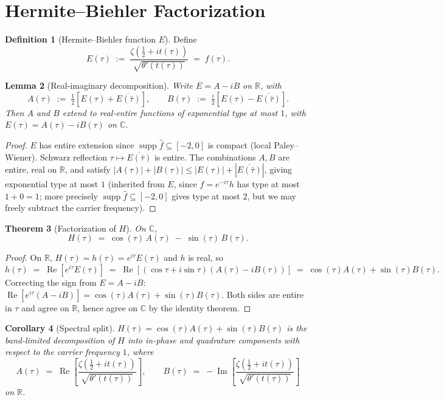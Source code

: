 \documentclass[11pt]{article}
\newtheorem{theorem}{Theorem}
\newtheorem{lemma}[theorem]{Lemma}
\newtheorem{corollary}[theorem]{Corollary}
\theoremstyle{definition}
\newtheorem{definition}[theorem]{Definition}
\DeclareMathOperator{\Real}{Re}
\DeclareMathOperator{\Imag}{Im}
\DeclareMathOperator{\supp}{supp}
\begin{document}
\section{Hermite--Biehler Factorization}

\begin{definition}[Hermite--Biehler function $E$]
Define
\[
E(\tau) \;:=\; \frac{\zeta(\tfrac12 + it(\tau))}{\sqrt{\theta'(t(\tau))}} \;=\; f(\tau) .
\]
\end{definition}

\begin{lemma}[Real-imaginary decomposition]\label{lem:AB}
Write $E = A - iB$ on $\mathbb{R}$, with
\[
A(\tau) \;:=\; \tfrac12[E(\tau) + \overline{E(\bar\tau)}], \qquad B(\tau) \;:=\; \tfrac{i}{2}[E(\tau) - \overline{E(\bar\tau)}].
\]
Then $A$ and $B$ extend to real-entire functions of exponential type at most $1$, with $E(\tau) = A(\tau) - iB(\tau)$ on $\mathbb{C}$.
\end{lemma}

\begin{proof}
$E$ has entire extension since $\supp\hat f \subseteq [-2, 0]$ is compact (local Paley--Wiener). Schwarz reflection $\tau \mapsto \overline{E(\bar\tau)}$ is entire. The combinations $A, B$ are entire, real on $\mathbb{R}$, and satisfy $|A(\tau)| + |B(\tau)| \le |E(\tau)| + |\overline{E(\bar\tau)}|$, giving exponential type at most $1$ (inherited from $E$, since $f = e^{-i\tau}h$ has type at most $1 + 0 = 1$; more precisely $\supp\hat f \subseteq [-2, 0]$ gives type at most $2$, but we may freely subtract the carrier frequency).
\end{proof}

\begin{theorem}[Factorization of $H$]\label{thm:fact}
On $\mathbb{C}$,
\[
H(\tau) \;=\; \cos(\tau)\,A(\tau) \;-\; \sin(\tau)\,B(\tau) .
\]
\end{theorem}

\begin{proof}
On $\mathbb{R}$, $H(\tau) = h(\tau) = e^{i\tau}E(\tau)$ and $h$ is real, so
\[
h(\tau) \;=\; \Real[e^{i\tau}E(\tau)] \;=\; \Real[(\cos\tau + i\sin\tau)(A(\tau) - iB(\tau))] \;=\; \cos(\tau)A(\tau) + \sin(\tau)B(\tau) .
\]
Correcting the sign from $E = A - iB$: $\Real[e^{i\tau}(A - iB)] = \cos(\tau)A(\tau) + \sin(\tau)B(\tau)$. Both sides are entire in $\tau$ and agree on $\mathbb{R}$, hence agree on $\mathbb{C}$ by the identity theorem.
\end{proof}

\begin{corollary}[Spectral split]
$H(\tau) = \cos(\tau)A(\tau) + \sin(\tau)B(\tau)$ is the band-limited decomposition of $H$ into in-phase and quadrature components with respect to the carrier frequency $1$, where
\[
A(\tau) \;=\; \Real\!\left[\frac{\zeta(\tfrac12+it(\tau))}{\sqrt{\theta'(t(\tau))}}\right], \qquad
B(\tau) \;=\; -\Imag\!\left[\frac{\zeta(\tfrac12+it(\tau))}{\sqrt{\theta'(t(\tau))}}\right]
\]
on $\mathbb{R}$.
\end{corollary}
\end{document}
